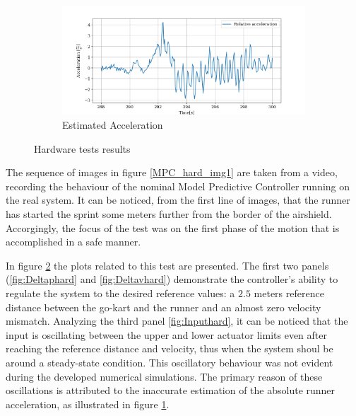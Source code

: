\documentclass[a4paper,12pt,oneside]{book}
\begin{document}
\begin{figure}[h!]
    \begin{subfigure}[t]{0.7\textwidth}
        \includegraphics[width=\textwidth]{Hardware_testMPC/Acceleration.png}
        \caption{Estimated Acceleration}
        \label{fig:Est_acc}
    \end{subfigure}
    \caption{Hardware tests results}
    \label{fig:Hardware_Test}
\end{figure}

The sequence of images in figure \ref{MPC_hard_img1} are taken from a video, recording the behaviour of the nominal Model Predictive Controller running on the real system.
It can be noticed, from the first line of images, that the runner has started the sprint some meters further from the border of the airshield.
Accorgingly, the focus of the test was on the first phase of the motion that is accomplished in a safe manner.

\bigskip
In figure \ref{fig:Hardware_Test} the plots related to this test are presented.
The first two panels (\ref{fig:Deltaphard} and \ref{fig:Deltavhard}) demonstrate the controller's ability to regulate the system to the desired reference values: a $2.5$ meters reference distance between the go-kart and the runner and an almost zero velocity mismatch.
Analyzing the third panel \ref{fig:Inputhard}, it can be noticed that the input is oscillating between the upper and lower actuator limits even after reaching the reference distance and velocity, thus when the system shoul be around a steady-state condition.
This oscillatory behaviour was not evident during the developed numerical simulations.
The primary reason of these oscillations is attributed to the inaccurate estimation of the absolute runner acceleration, as illustrated in figure \ref{fig:Est_acc}.
\end{document}
